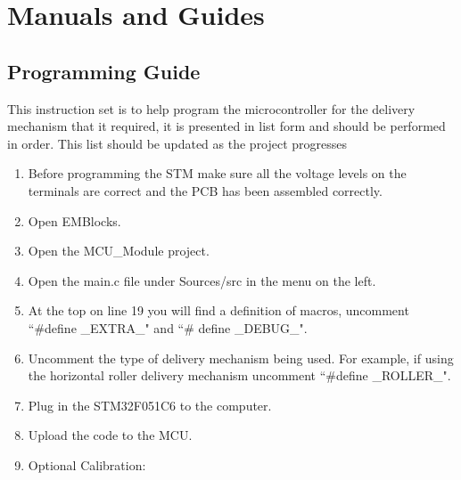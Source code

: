 \documentclass[a4paper,11pt]{article}
\numberwithin{figure}{section}
\numberwithin{table}{section}
\begin{document}
\begin{appendices}
\begin{lstlisting}
\end{lstlisting}

\newpage
\section{Manuals and Guides}\thispagestyle{sectionstart}

\subsection{Programming Guide}
\label{subsec:progamming}
This instruction set is to help program the microcontroller for the delivery mechanism that it required, it is presented in list form and should be performed in order. This list should be updated as the project progresses
\begin{enumerate}
  \item Before programming the STM make sure all the voltage levels on the terminals are correct and the PCB has been assembled correctly.
  \item Open EMBlocks.
  \item Open the MCU\_Module project.
  \item Open the main.c file under Sources/src in the menu on the left.
  \item At the top on line 19 you will find a definition of macros, uncomment ``\#define \_EXTRA\_" and ``\# define \_DEBUG\_".
  \item Uncomment the type of delivery mechanism being used. For example, if using the horizontal roller delivery mechanism uncomment ``\#define \_ROLLER\_".
  \item Plug in the STM32F051C6 to the computer.
  \item Upload the code to the MCU.
  \item Optional Calibration: {
  \begin{enumerate}
 

\end{enumerate}}
\end{enumerate}
\end{appendices}
\end{document}
